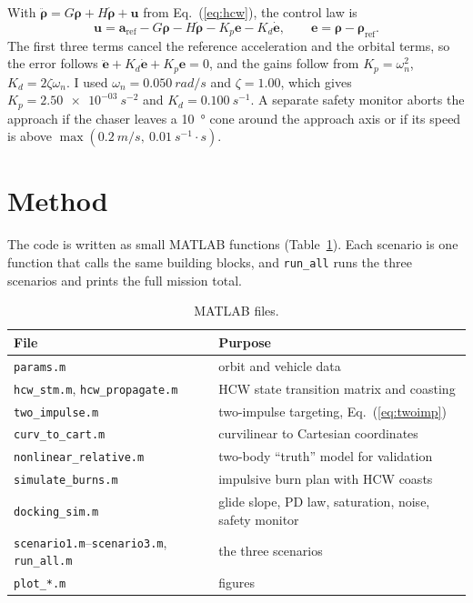 \documentclass[letterpaper,10pt]{article}
\newcommand{\vv}[1]{\bm{#1}}
\begin{document}
With $\ddot{\vv{\rho}} = G\vv{\rho} + H\dot{\vv{\rho}} + \vv{u}$ from
Eq.~(\ref{eq:hcw}), the control law is
\begin{equation}
  \vv{u} = \vv{a}_{\mathrm{ref}} - G\vv{\rho} - H\dot{\vv{\rho}} - K_p\vv{e} - K_d\dot{\vv{e}},
  \qquad \vv{e} = \vv{\rho} - \vv{\rho}_{\mathrm{ref}} .
  \label{eq:ctrl}
\end{equation}
The first three terms cancel the reference acceleration and the orbital
terms, so the error follows $\ddot{\vv{e}} + K_d\dot{\vv{e}} + K_p\vv{e} = 0$,
and the gains follow from $K_p = \omega_n^2$, $K_d = 2\zeta\omega_n$. I used
$\omega_n = \SI{0.050}{rad/s}$ and $\zeta = 1.00$, which gives
$K_p = \SI{2.50e-03}{s^{-2}}$ and $K_d = \SI{0.100}{s^{-1}}$. A separate safety
monitor aborts the approach if the chaser leaves a \SI{10}{\degree} cone
around the approach axis or if its speed is above
$\max(\SI{0.2}{m/s},\ \SI{0.01}{s^{-1}} \cdot s)$.

\section{Method}

The code is written as small MATLAB functions (Table~\ref{tab:code}). Each
scenario is one function that calls the same building blocks, and
\texttt{run\_all} runs the three scenarios and prints the full mission
total.

\begin{table}[htbp]
\centering
\caption{MATLAB files.}
\label{tab:code}
\begin{tabular}{@{}ll@{}}
\toprule
File & Purpose \\
\midrule
\texttt{params.m} & orbit and vehicle data \\
\texttt{hcw\_stm.m}, \texttt{hcw\_propagate.m} & HCW state transition matrix and coasting \\
\texttt{two\_impulse.m} & two-impulse targeting, Eq.~(\ref{eq:twoimp}) \\
\texttt{curv\_to\_cart.m} & curvilinear to Cartesian coordinates \\
\texttt{nonlinear\_relative.m} & two-body ``truth'' model for validation \\
\texttt{simulate\_burns.m} & impulsive burn plan with HCW coasts \\
\texttt{docking\_sim.m} & glide slope, PD law, saturation, noise, safety monitor \\
\texttt{scenario1.m}--\texttt{scenario3.m}, \texttt{run\_all.m} & the three scenarios \\
\texttt{plot\_*.m} & figures \\
\bottomrule
\end{tabular}
\end{table}
\end{document}
